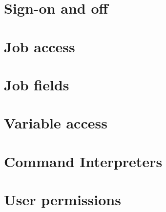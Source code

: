 \section[Sign{}-on and off]{Sign-on and off}






\section{Job access}












\section{Job fields}















\section{Variable access}











\section{Command Interpreters}




\section{User permissions}





